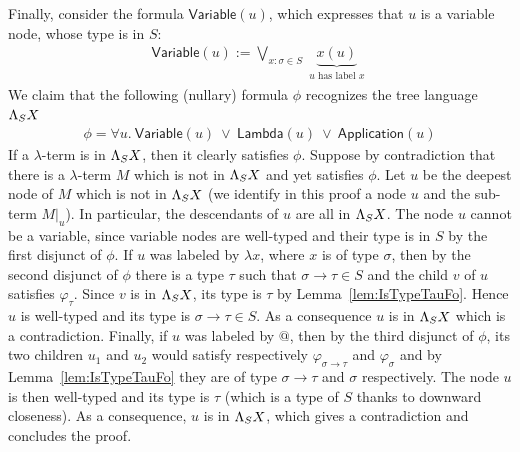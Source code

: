 Finally, consider the formula $\mathsf{Variable}(u)$, which expresses that $u$ is a variable node, whose type is in $S$:
\begin{align*}
\mathsf{Variable}(u) :=  \bigvee_{x:\sigma\in S}\underbrace{x(u)}_{\substack{\text{$u$ has label $x$}}} 
\end{align*}  
We claim that the following (nullary) formula $\phi$ recognizes the tree language $\Lambda_{S} X$
\begin{align*}
\phi = \forall u.\ \mathsf{Variable}(u)\ \vee\ \mathsf{Lambda}(u)\ \vee\  \mathsf{Application}(u)
\end{align*}
If a $\lambda$-term is in $\Lambda_{S} X$, then it clearly satisfies $\phi$. Suppose by contradiction that there is a $\lambda$-term $M$ which is not in $\Lambda_{S} X$ and yet satisfies $\phi$. Let $u$  be the deepest node of $M$ which is not in $\Lambda_{S} X$ (we identify in this proof a node $u$ and the sub-term $M|_u$). In particular, the descendants of $u$ are all in $\Lambda_{S} X$. The node $u$ cannot be a variable, since variable nodes are well-typed and their type is in $S$ by the first disjunct of $\phi$.  If $u$ was labeled by $\lambda x$, where $x$ is of type $\sigma$, then by the second disjunct of $\phi$ there is a type $\tau$ such that $\sigma\rightarrow\tau\in S$ and the child $v$ of $u$  satisfies $\varphi_\tau$. Since $v$ is in $\Lambda_{S} X$, its type is $\tau$ by Lemma~\ref{lem:IsTypeTauFo}. Hence $u$ is well-typed and its type is $\sigma\rightarrow\tau\in S$. As a consequence $u$ is in $\Lambda_{S} X$ which is a contradiction.  Finally, if $u$ was labeled by $@$, then by the third disjunct of $\phi$, its two children $u_1$ and $u_2$
would satisfy respectively $\varphi_{\sigma\rightarrow\tau}$ and  $\varphi_{\sigma}$ and by Lemma~\ref{lem:IsTypeTauFo} they are of type $\sigma\rightarrow\tau$ and $\sigma$ respectively. The node $u$ is then well-typed and its type is $\tau$ (which is a type of $S$ thanks to downward closeness). As a consequence, $u$ is in $\Lambda_{S} X$, which gives a contradiction and concludes the proof.
 \smallskip
 
